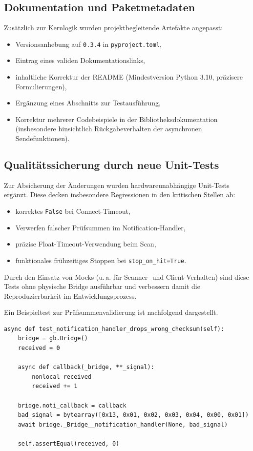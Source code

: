 \subsection{Dokumentation und Paketmetadaten}
Zusätzlich zur Kernlogik wurden projektbegleitende Artefakte angepasst:
\begin{itemize}
	\item Versionsanhebung auf \texttt{0.3.4} in \texttt{pyproject.toml},
	\item Eintrag eines validen Dokumentationslinks,
	\item inhaltliche Korrektur der README (Mindestversion Python 3.10, präzisere Formulierungen),
	\item Ergänzung eines Abschnitts zur Testausführung,
	\item Korrektur mehrerer Codebeispiele in der Bibliotheksdokumentation (insbesondere hinsichtlich Rückgabeverhalten der asynchronen Sendefunktionen).
\end{itemize}

\subsection{Qualitätssicherung durch neue Unit-Tests}
Zur Absicherung der Änderungen wurden hardwareunabhängige Unit-Tests ergänzt.
Diese decken insbesondere Regressionen in den kritischen Stellen ab:
\begin{itemize}
	\item korrektes \texttt{False} bei Connect-Timeout,
	\item Verwerfen falscher Prüfsummen im Notification-Handler,
	\item präzise Float-Timeout-Verwendung beim Scan,
	\item funktionales frühzeitiges Stoppen bei \texttt{stop\_on\_hit=True}.
\end{itemize}

Durch den Einsatz von Mocks (u.\,a. für Scanner- und Client-Verhalten) sind diese Tests ohne physische Bridge ausführbar und verbessern damit die Reproduzierbarkeit im Entwicklungsprozess.

Ein Beispieltest zur Prüfsummenvalidierung ist nachfolgend dargestellt.

\begin{listing}[ht]
\caption{Auszug: Unit-Test zum Verwerfen fehlerhafter Notifications}
\label{lst:unit-test-checksum}
\begin{verbatim}
async def test_notification_handler_drops_wrong_checksum(self):
	bridge = gb.Bridge()
	received = 0

	async def callback(_bridge, **_signal):
		nonlocal received
		received += 1

	bridge.noti_callback = callback
	bad_signal = bytearray([0x13, 0x01, 0x02, 0x03, 0x04, 0x00, 0x01])
	await bridge._Bridge__notification_handler(None, bad_signal)

	self.assertEqual(received, 0)
\end{verbatim}
\end{listing}

